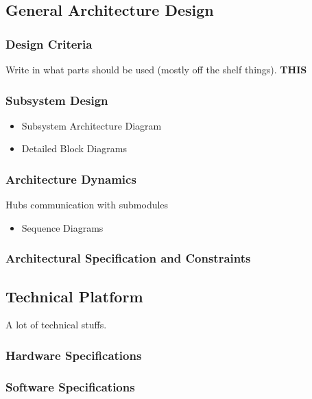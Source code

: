 \subsection{General Architecture Design}
	\subsubsection{Design Criteria}
		Write in what parts should be used (mostly off the shelf things).  \textbf{THIS}
	\subsubsection{Subsystem Design}
		\begin{itemize}
			\item Subsystem Architecture Diagram
			\item Detailed Block Diagrams
		\end{itemize}
	\subsubsection{Architecture Dynamics}
		Hubs communication with submodules
		\begin{itemize}
			\item Sequence Diagrams
		\end{itemize}
	\subsubsection{Architectural Specification and Constraints}
\subsection{Technical Platform}
	A lot of technical stuffs. 
	\subsubsection{Hardware Specifications}
	\subsubsection{Software Specifications}